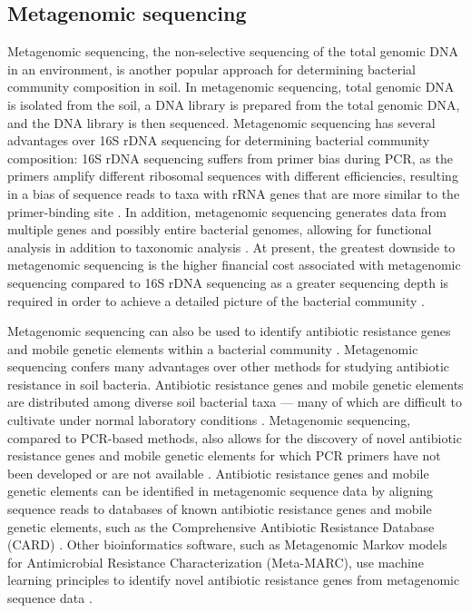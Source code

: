 \subsection{Metagenomic sequencing}

Metagenomic sequencing, the non-selective sequencing of the total genomic DNA in an environment, is another popular approach for determining bacterial community composition in soil.
In metagenomic sequencing, total genomic DNA is isolated from the soil, a DNA library is prepared from the total genomic DNA, and the DNA library is then sequenced.
Metagenomic sequencing has several advantages over 16S rDNA sequencing for determining bacterial community composition:
16S rDNA sequencing suffers from primer bias during PCR, as the primers amplify different ribosomal sequences with different efficiencies, resulting in a bias of sequence reads to taxa with rRNA genes that are more similar to the primer-binding site \parencite{Tremblay.2015}.
In addition, metagenomic sequencing generates data from multiple genes and possibly entire bacterial genomes, allowing for functional analysis in addition to taxonomic analysis \parencite{Li.2015c}.
At present, the greatest downside to metagenomic sequencing is the higher financial cost associated with metagenomic sequencing compared to 16S rDNA sequencing as a greater sequencing depth is required in order to achieve a detailed picture of the bacterial community \parencite{Scholz.2012}.

Metagenomic sequencing can also be used to identify antibiotic resistance genes and mobile genetic elements within a bacterial community \parencite{Boolchandani.2019}.
Metagenomic sequencing confers many advantages over other methods for studying antibiotic resistance in soil bacteria.
Antibiotic resistance genes and mobile genetic elements are distributed among diverse soil bacterial taxa --- many of which are difficult to cultivate under normal laboratory conditions \parencite{Dunivin.2019}.
Metagenomic sequencing, compared to PCR-based methods, also allows for the discovery of novel antibiotic resistance genes and mobile genetic elements for which PCR primers have not been developed or are not available \parencite{Boolchandani.2019}.
Antibiotic resistance genes and mobile genetic elements can be identified in metagenomic sequence data by aligning sequence reads to databases of known antibiotic resistance genes and mobile genetic elements, such as the Comprehensive Antibiotic Resistance Database (CARD) \parencite{Alcock.2020}.
Other bioinformatics software, such as Metagenomic Markov models for Antimicrobial Resistance Characterization (Meta-MARC), use machine learning principles to identify novel antibiotic resistance genes from metagenomic sequence data \parencite{Lakin.2019}.

